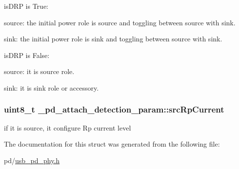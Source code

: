 \begin{DoxyItemize}
\item is\-D\-R\-P is True\-:
\begin{DoxyItemize}
\item source\-: the initial power role is source and toggling between source with sink.
\item sink\-: the initial power role is sink and toggling between source with sink.
\end{DoxyItemize}
\item is\-D\-R\-P is False\-:
\begin{DoxyItemize}
\item source\-: it is source role.
\item sink\-: it is sink role or accessory. 
\end{DoxyItemize}
\end{DoxyItemize}\hypertarget{struct__pd__attach__detection__param_a9745c17522adaa5e1e8372df1a57f233}{
\subsubsection[{src\-Rp\-Current}]{\setlength{\rightskip}{0pt plus 5cm}uint8\-\_\-t \-\_\-pd\-\_\-attach\-\_\-detection\-\_\-param\-::src\-Rp\-Current}}\label{struct__pd__attach__detection__param_a9745c17522adaa5e1e8372df1a57f233}
if it is source, it configure Rp current level 

The documentation for this struct was generated from the following file\-:\begin{DoxyCompactItemize}
\item 
pd/\hyperlink{usb__pd__phy_8h}{usb\-\_\-pd\-\_\-phy.\-h}\end{DoxyCompactItemize}
